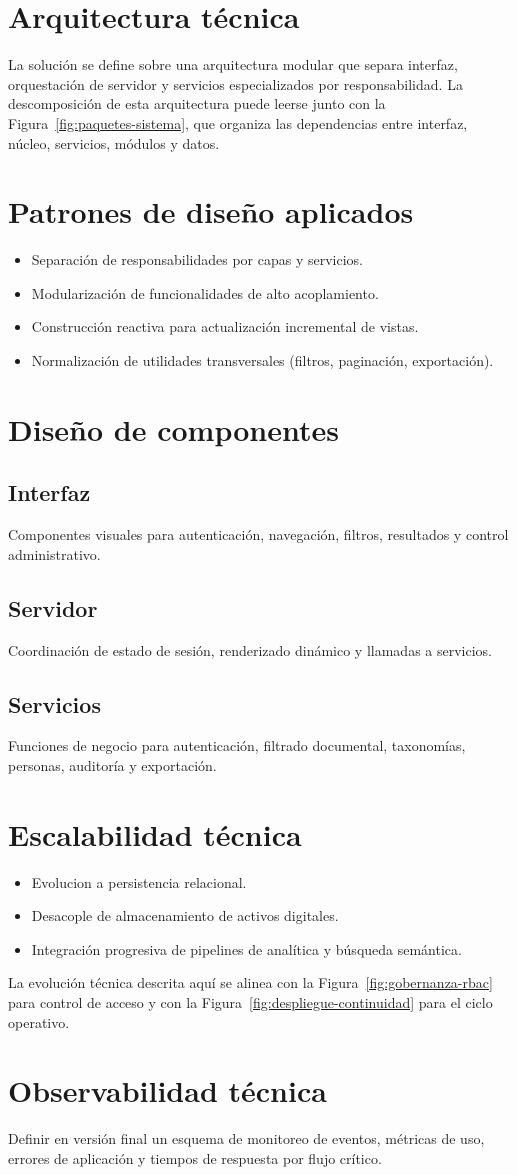 \section{Arquitectura técnica}
La solución se define sobre una arquitectura modular que separa interfaz, orquestación de servidor y servicios especializados por responsabilidad.
La descomposición de esta arquitectura puede leerse junto con la Figura~\ref{fig:paquetes-sistema}, que organiza las dependencias entre interfaz, núcleo, servicios, módulos y datos.

\section{Patrones de diseño aplicados}
\begin{itemize}
  \item Separación de responsabilidades por capas y servicios.
  \item Modularización de funcionalidades de alto acoplamiento.
  \item Construcción reactiva para actualización incremental de vistas.
  \item Normalización de utilidades transversales (filtros, paginación, exportación).
\end{itemize}

\section{Diseño de componentes}
\subsection{Interfaz}
Componentes visuales para autenticación, navegación, filtros, resultados y control administrativo.

\subsection{Servidor}
Coordinación de estado de sesión, renderizado dinámico y llamadas a servicios.

\subsection{Servicios}
Funciones de negocio para autenticación, filtrado documental, taxonomías, personas, auditoría y exportación.

\section{Escalabilidad técnica}
\begin{itemize}
  \item Evolucion a persistencia relacional.
  \item Desacople de almacenamiento de activos digitales.
  \item Integración progresiva de pipelines de analítica y búsqueda semántica.
\end{itemize}
La evolución técnica descrita aquí se alinea con la Figura~\ref{fig:gobernanza-rbac} para control de acceso y con la Figura~\ref{fig:despliegue-continuidad} para el ciclo operativo.

\section{Observabilidad técnica}
Definir en versión final un esquema de monitoreo de eventos, métricas de uso, errores de aplicación y tiempos de respuesta por flujo crítico.
